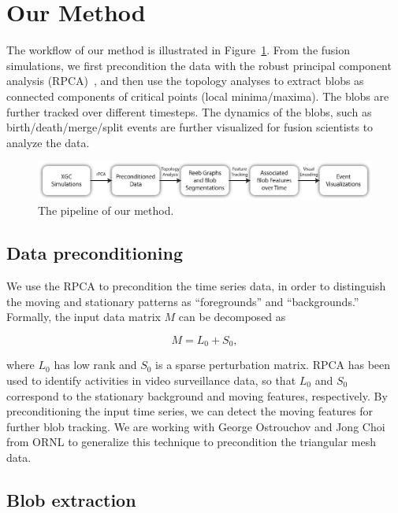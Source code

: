 \section{Our Method}
\label{sec:method}

The workflow of our method is illustrated in Figure~\ref{fig:pipeline}.  
From the fusion simulations, we first precondition the data with the robust principal component analysis (RPCA)~\cite{CandesLMW11}, and then use the topology analyses to extract blobs as connected components of critical points (local minima/maxima).  The blobs are further tracked over different timesteps.  The dynamics of the blobs, such as birth/death/merge/split events are further visualized for fusion scientists to analyze the data.  



\begin{figure}
  \centering
  \includegraphics[width=\linewidth]{Figs/pipeline}
  \caption{The pipeline of our method.}
  \label{fig:pipeline}
\end{figure}


\subsection{Data preconditioning}

We use the RPCA to precondition the time series data, in order to distinguish the moving and stationary patterns as ``foregrounds'' and ``backgrounds.''  Formally, the input data matrix $M$ can be decomposed as 

\begin{equation}
M = L_0 + S_0, 
\end{equation}

\noindent where $L_0$ has low rank and $S_0$ is a sparse perturbation matrix.  RPCA has been used to identify activities in video surveillance data, so that $L_0$ and $S_0$ correspond to the stationary background and moving features, respectively.  By preconditioning the input time series, we can detect the moving features for further blob tracking.  We are working with George Ostrouchov and Jong Choi from ORNL to generalize this technique to precondition the triangular mesh data.  


\subsection{Blob extraction}

